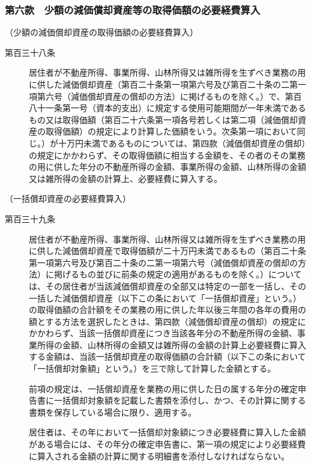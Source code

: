 \documentclass[twocolumn,a4j,10pt]{ltjtarticle}
\begin{document}
\subsubsection*{第六款　少額の減価償却資産等の取得価額の必要経費算入}
\noindent\hspace{10pt}（少額の減価償却資産の取得価額の必要経費算入）
\begin{description}
\item[第百三十八条]居住者が不動産所得、事業所得、山林所得又は雑所得を生ずべき業務の用に供した減価償却資産（第百二十条第一項第六号及び第百二十条の二第一項第六号（減価償却資産の償却の方法）に掲げるものを除く。）で、第百八十一条第一号（資本的支出）に規定する使用可能期間が一年未満であるもの又は取得価額（第百二十六条第一項各号若しくは第二項（減価償却資産の取得価額）の規定により計算した価額をいう。次条第一項において同じ。）が十万円未満であるものについては、第四款（減価償却資産の償却）の規定にかかわらず、その取得価額に相当する金額を、その者のその業務の用に供した年分の不動産所得の金額、事業所得の金額、山林所得の金額又は雑所得の金額の計算上、必要経費に算入する。
\end{description}
\noindent\hspace{10pt}（一括償却資産の必要経費算入）
\begin{description}
\item[第百三十九条]居住者が不動産所得、事業所得、山林所得又は雑所得を生ずべき業務の用に供した減価償却資産で取得価額が二十万円未満であるもの（第百二十条第一項第六号及び第百二十条の二第一項第六号（減価償却資産の償却の方法）に掲げるもの並びに前条の規定の適用があるものを除く。）については、その居住者が当該減価償却資産の全部又は特定の一部を一括し、その一括した減価償却資産（以下この条において「一括償却資産」という。）の取得価額の合計額をその業務の用に供した年以後三年間の各年の費用の額とする方法を選択したときは、第四款（減価償却資産の償却）の規定にかかわらず、当該一括償却資産につき当該各年分の不動産所得の金額、事業所得の金額、山林所得の金額又は雑所得の金額の計算上必要経費に算入する金額は、当該一括償却資産の取得価額の合計額（以下この条において「一括償却対象額」という。）を三で除して計算した金額とする。
\item[]前項の規定は、一括償却資産を業務の用に供した日の属する年分の確定申告書に一括償却対象額を記載した書類を添付し、かつ、その計算に関する書類を保存している場合に限り、適用する。
\item[]居住者は、その年において一括償却対象額につき必要経費に算入した金額がある場合には、その年分の確定申告書に、第一項の規定により必要経費に算入される金額の計算に関する明細書を添付しなければならない。
\end{description}
\end{document}
